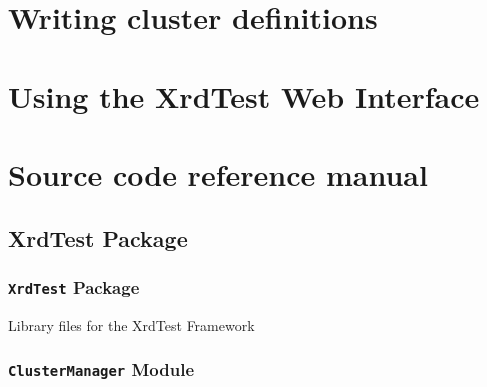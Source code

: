 \documentclass[letterpaper,10pt,english]{sphinxmanual}
\begin{document}
\chapter{Writing cluster definitions}
\label{clusters::doc}\label{clusters:writing-cluster-definitions}

\chapter{Using the XrdTest Web Interface}
\label{web-interface:using-the-xrdtest-web-interface}\label{web-interface::doc}

\chapter{Source code reference manual}
\label{ref-manual::doc}\label{ref-manual:source-code-reference-manual}

\section{XrdTest Package}
\label{ref-manual/XrdTest:xrdtest-package}\label{ref-manual/XrdTest::doc}

\subsection{\texttt{XrdTest} Package}
\label{ref-manual/XrdTest:id1}\label{ref-manual/XrdTest:module-XrdTest}
Library files for the XrdTest Framework


\subsection{\texttt{ClusterManager} Module}
\label{ref-manual/XrdTest:clustermanager-module}\label{ref-manual/XrdTest:module-XrdTest.ClusterManager}\label{ref-manual/XrdTest:module-ClusterManager}
\end{document}

